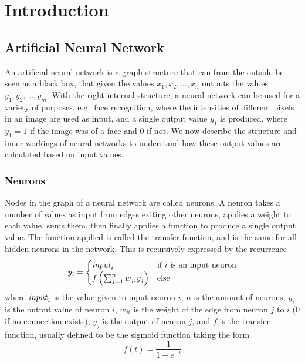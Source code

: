 \section{Introduction}


\subsection{Artificial Neural Network}
An artificial neural network is a graph structure that can from the outside be seen as a black box, that given the values $x_1, x_2, \dots, x_n$ outputs the values $y_1, y_2, \dots, y_m$. With the right internal structure, a neural network can be used for a variety of purposes, e.g.\ face recognition, where the intensities of different pixels in an image are used as input, and a single output value $y_1$ is produced, where $y_1 = 1$ if the image was of a face and $0$ if not. We now describe the structure and inner workings of neural networks to understand how these output values are calculated based on input values.

\subsubsection{Neurons}
Nodes in the graph of a neural network are called neurons. A neuron takes a number of values as input from edges exiting other neurons, applies a weight to each value, sums them, then finally applies a function to produce a single output value. The function applied is called the transfer function, and is the same for all hidden neurons in the network. This is recursively expressed by the recurrence
\begin{equation}
  y_i =
  \begin{cases}
    \var{input}_i & \text{if } i \text{ is an input neuron} \\
    f\left(\sum_{j=1}^n w_{ji} y_{j} \right) & \text{else} %
  \end{cases}
\end{equation}
where $\mathit{input}_i$ is the value given to input neuron $i$, $n$ is the amount of neurons, $y_i$ is the output value of neuron $i$, $w_{ji}$ is the weight of the edge from neuron $j$ to $i$ ($0$ if no connection exists), $y_j$ is the output of neuron $j$, and $f$ is the transfer function, usually defined to be the sigmoid function taking the form
\begin{equation*}
  f(t) = \frac{1}{1+e^{-t}}
\end{equation*}

